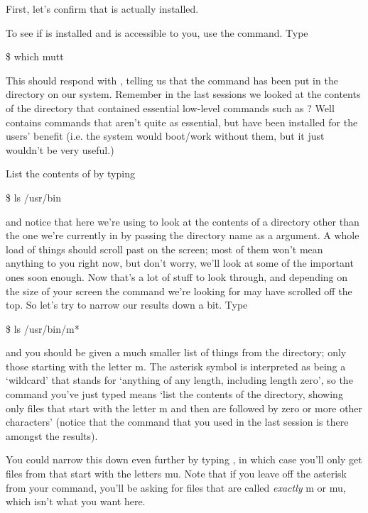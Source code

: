 First, let's confirm that  is actually installed. 

To see if  is installed and is accessible to you, use the  command. Type

\begin{ttoutenv}
\$ which mutt
\end{ttoutenv}

This should respond with , telling us that the  command has been put in the  directory on our system. Remember in the last sessions we looked at the contents of the  directory that contained essential low-level commands such as ? Well  contains commands that aren't quite as essential, but have been installed for the users' benefit (i.e. the system would boot/work without them, but it just wouldn't be very useful.) 

List the contents of  by typing
\begin{ttoutenv}
\$ ls /usr/bin
\end{ttoutenv}

and notice that here we're using  to look at the contents of a directory other than the one we're currently in by passing the directory name as a argument. A whole load of things should scroll past on the screen; most of them won't mean anything to you right now, but don't worry, we'll look at some of the important ones soon enough. Now that's a lot of stuff to look through, and depending on the size of your screen the command we're looking for may have scrolled off the top. So let's try to narrow our results down a bit. Type 

\begin{ttoutenv}
\$ ls /usr/bin/m*
\end{ttoutenv}


and you should be given a much smaller list of things from the  directory; only those starting with the letter m. The asterisk symbol is interpreted as being a `wildcard' that stands for `anything of any length, including length zero', so the command you've just typed means `list the contents of the  directory, showing only files that start with the letter m and then are followed by zero or more other characters' (notice that the  command that you used in the last session is there amongst the results). 

You could narrow this down even further by typing , in which case you'll only get files from  that start with the letters mu. Note that if you leave off the asterisk from your command, you'll be asking for files that are called \textit{exactly} m or mu, which isn't what you want here.

